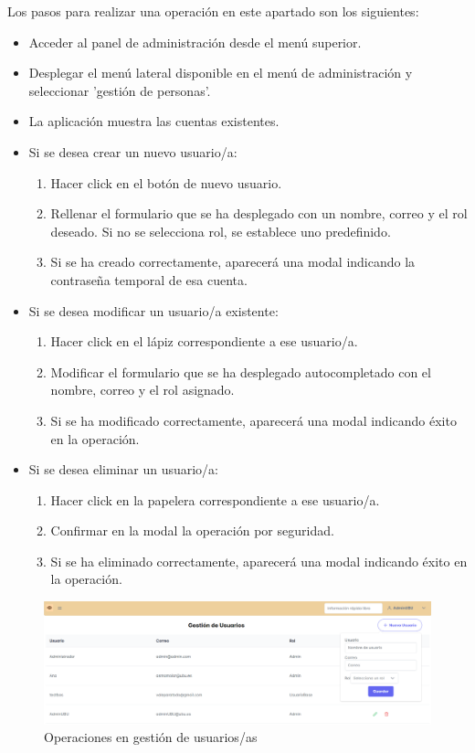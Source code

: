 Los pasos para realizar una operación en este apartado son los siguientes:
\begin{itemize}
    \item Acceder al panel de administración desde el menú superior.
    \item Desplegar el menú lateral disponible en el menú de administración y seleccionar 'gestión de personas'.
    \item La aplicación muestra las cuentas existentes.
    \item Si se desea crear un nuevo usuario/a:
    \begin{enumerate}
        \item Hacer click en el botón de nuevo usuario.
        \item Rellenar el formulario que se ha desplegado con un nombre, correo y el rol deseado. Si no se selecciona rol, se establece uno predefinido.
        \item Si se ha creado correctamente, aparecerá una modal indicando la contraseña temporal de esa cuenta.
    \end{enumerate}
    \item Si se desea modificar un usuario/a  existente:
    \begin{enumerate}
        \item Hacer click en el lápiz correspondiente a ese usuario/a.
        \item Modificar el formulario que se ha desplegado autocompletado con el nombre, correo y el rol asignado.
        \item Si se ha modificado correctamente, aparecerá una modal indicando éxito en la operación.
    \end{enumerate}
    \item Si se desea eliminar un usuario/a:
    \begin{enumerate}
        \item Hacer click en la papelera correspondiente a ese usuario/a.
        \item Confirmar en la modal la operación por seguridad.
        \item Si se ha eliminado correctamente, aparecerá una modal indicando éxito en la operación.
    \end{enumerate}
\end{itemize}
\begin{figure}[h]
    \centering
    \includegraphics[width=1\linewidth]{Imagenes/ManualUsuarios.png}
    \caption{Operaciones en gestión de usuarios/as}
    \label{Operaciones en gestión de usuarios/as}
\end{figure}
\FloatBarrier

